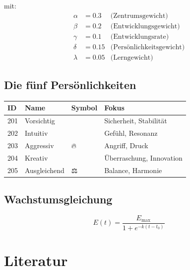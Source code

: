 \documentclass[11pt,a4paper]{article}
\begin{document}
mit:
\begin{align*}
\alpha &= 0.3 & \text{(Zentrumsgewicht)} \\
\beta &= 0.2 & \text{(Entwicklungsgewicht)} \\
\gamma &= 0.1 & \text{(Entwicklungsrate)} \\
\delta &= 0.15 & \text{(Persönlichkeitsgewicht)} \\
\lambda &= 0.05 & \text{(Lerngewicht)}
\end{align*}

\subsection{Die fünf Persönlichkeiten}

\begin{table}[h]
\centering
\begin{tabular}{p{} p{} p{} p{}}
\toprule
\textbf{ID} & \textbf{Name} & \textbf{Symbol} & \textbf{Fokus} \\
\midrule
201 & Vorsichtig & 🌿 & Sicherheit, Stabilität \\
202 & Intuitiv & 💛 & Gefühl, Resonanz \\
203 & Aggressiv & 🔥 & Angriff, Druck \\
204 & Kreativ & 💎 & Überraschung, Innovation \\
205 & Ausgleichend & ⚖️ & Balance, Harmonie \\
\bottomrule
\end{tabular}
\end{table}

\subsection{Wachstumsgleichung}

\begin{equation}
E(t) = \frac{E_{\text{max}}}{1 + e^{-k(t - t_0)}}
\end{equation}

\section*{Literatur}
\end{document}
